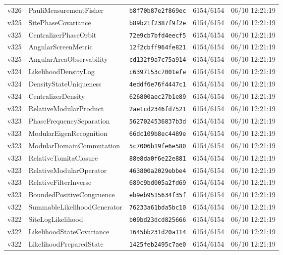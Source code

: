 \documentclass[11pt]{article}
\theoremstyle{definition}\newtheorem{deriv}{Derivation}
\begin{document}
{\begin{longtable}{@{}lllll@{}}
v326 & PauliMeasurementFisher & \texttt{b8f70b87e2f869ec} & 6154/6154 & 06/10 12:21:19 \\
v325 & SitePhaseCovariance & \texttt{b89b21f2387f9f2e} & 6154/6154 & 06/10 12:21:19 \\
v325 & CentralizerPhaseOrbit & \texttt{72e9cb7bfd4eecf5} & 6154/6154 & 06/10 12:21:19 \\
v325 & AngularScreenMetric & \texttt{12f2cbff964fe821} & 6154/6154 & 06/10 12:21:19 \\
v325 & AngularAreaObservability & \texttt{cd132f9a7c75a914} & 6154/6154 & 06/10 12:21:19 \\
v324 & LikelihoodDensityLog & \texttt{c6397153c7001efe} & 6154/6154 & 06/10 12:21:19 \\
v324 & DensityStateUniqueness & \texttt{4eddf6e76f4447c1} & 6154/6154 & 06/10 12:21:19 \\
v324 & CentralizerDensity & \texttt{626800aec27b1e89} & 6154/6154 & 06/10 12:21:19 \\
v323 & RelativeModularProduct & \texttt{2ae1cd2346fd7521} & 6154/6154 & 06/10 12:21:19 \\
v323 & PhaseFrequencySeparation & \texttt{5627024536837b3d} & 6154/6154 & 06/10 12:21:19 \\
v323 & ModularEigenRecognition & \texttt{66dc109b8ec4489e} & 6154/6154 & 06/10 12:21:19 \\
v323 & ModularDomainCommutation & \texttt{5c7006b19fe6e580} & 6154/6154 & 06/10 12:21:19 \\
v323 & RelativeTomitaClosure & \texttt{88e8da0f6e22e881} & 6154/6154 & 06/10 12:21:19 \\
v323 & RelativeModularOperator & \texttt{463800a2029ebbe4} & 6154/6154 & 06/10 12:21:19 \\
v323 & RelativeFilterInverse & \texttt{689c9bd005a2fd69} & 6154/6154 & 06/10 12:21:19 \\
v323 & BoundedPositiveCongruence & \texttt{eb9eb9515634f35f} & 6154/6154 & 06/10 12:21:19 \\
v322 & SummableLikelihoodGenerator & \texttt{76233a61bda5bc10} & 6154/6154 & 06/10 12:21:19 \\
v322 & SiteLogLikelihood & \texttt{b09bd23dcd825666} & 6154/6154 & 06/10 12:21:19 \\
v322 & LikelihoodStateCovariance & \texttt{1645bb231d20a114} & 6154/6154 & 06/10 12:21:19 \\
v322 & LikelihoodPreparedState & \texttt{1425feb2495c7ae0} & 6154/6154 & 06/10 12:21:19 \\

\end{longtable}}
\end{document}
